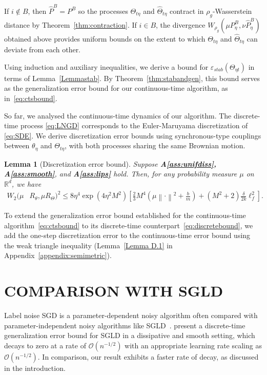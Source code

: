 \documentclass{article}
\newcommand{\norm}[1]{\left\lVert#1\right\rVert} %
\newtheorem{lemma}{Lemma}
\begin{document}
If $i \notin B$, then $\widehat{P}^B = P^B$ so the processes $\Theta_{t\eta}$ and $\widehat{\Theta}_{t\eta}$ contract in $\rho_g$-Wasserstein distance by Theorem~\ref{thm:contraction}. If $i \in B$, the divergence $W_{\rho_g} (\mu P_\eta^B, \nu \widehat{P}_\eta^B)$ obtained above provides uniform bounds on the extent to which $\Theta_{t \eta}$ and $\widehat{\Theta}_{t\eta}$ can deviate from each other. 

Using induction and auxiliary inequalities, we derive a bound for $\varepsilon_{stab}(\Theta_{\eta t})$ in terms of Lemma~\ref{Lemmastab}. By Theorem~\ref{thm:stabandgen}, this bound serves as the generalization error bound for our continuous-time algorithm, as in~\eqref{eq:ctsbound}.
 
So far, we analysed the continuous-time dynamics of our algorithm. The discrete-time process \eqref{eq:LNGD} corresponds to the Euler-Maruyama discretization of \eqref{eq:SDE}. We derive discretization error bounds using synchronous-type couplings between $\theta_\eta$ and $\Theta_{t \eta}$, with both processes sharing the same Brownian motion.

\begin{lemma}[Discretization error bound]\label{lemma:discretization}
    Suppose \textbf{A\ref{ass:unifdiss}, A\ref{ass:smooth}}, and \textbf{A\ref{ass:lips}} hold. Then, for any probability measure $\mu$ on $\mathbb{R}^d$, we have
    \begin{align*}
        W_2(\mu &R_\theta, \mu R_\Theta)^2 \leq 8 \eta^4  \exp \left( 4 \eta^2 M^2 \right) \left[  \frac{2}{3}  M^4 \left( \mu\norm{\cdot}^2 + \frac{b}{m}\right)   + \left( M^2 +2 \right) \frac{\delta }{2k} \ell_f^2\right].
    \end{align*}
\end{lemma}

To extend the generalization error bound established for the continuous-time algorithm~\eqref{eq:ctsbound} to its discrete-time counterpart~\eqref{eq:discretebound}, we add the one-step discretization error to the continuous-time error bound using the weak triangle inequality (Lemma~\ref{Lemma D.1} in Appendix~\ref{appendix:semimetric}).

\section{COMPARISON WITH SGLD}
Label noise SGD is a parameter-dependent noisy algorithm often compared with parameter-independent noisy algorithms like SGLD~\citep{Haochen}. \citet{Farghly} present a discrete-time generalization error bound for SGLD in a dissipative and smooth setting, which decays to zero at a rate of $\mathcal{O}(n^{-1/2})$ with an appropriate learning rate scaling as $\mathcal{O}(n^{-1/2})$. In comparison, our result exhibits a faster rate of decay, as discussed in the introduction. 
\end{document}
